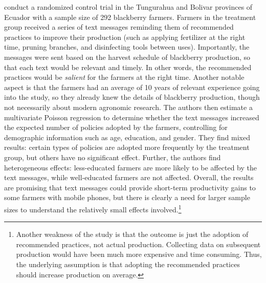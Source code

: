 \documentclass[12pt]{article}
\begin{document}
\textcite{carrion-yaguana_promoting_2020} conduct a randomized control trial in the Tungurahua and Bolivar provinces of Ecuador with a sample size of 292 blackberry farmers. Farmers in the treatment group received a series of text messages reminding them of recommended practices to improve their production (such as applying fertilizer at the right time, pruning branches, and disinfecting tools between uses). Importantly, the messages were sent based on the harvest schedule of blackberry production, so that each text would be relevant and timely. In other words, the recommended practices would be \textit{salient} for the farmers at the right time. Another notable aspect is that the farmers had an average of 10 years of relevant experience going into the study, so they already knew the details of blackberry production, though not necessarily about modern agronomic research. The authors then estimate a multivariate Poisson regression to determine whether the text messages increased the expected number of policies adopted by the farmers, controlling for demographic information such as age, education, and gender. They find mixed results: certain types of policies are adopted more frequently by the treatment group, but others have no significant effect. Further, the authors find heterogeneous effects: less-educated farmers are more likely to be affected by the text messages, while well-educated farmers are not affected. Overall, the results are promising that text messages could provide short-term productivity gains to some farmers with mobile phones, but there is clearly a need for larger sample sizes to understand the relatively small effects involved.\footnote{Another weakness of the study is that the outcome is just the adoption of recommended practices, not actual production. Collecting data on subsequent production would have been much more expensive and time consuming. Thus, the underlying assumption is that adopting the recommended practices should increase production on average.}
\end{document}
